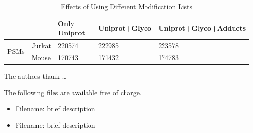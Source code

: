 \documentclass[journal=jprobs,manuscript=article]{achemso}
\begin{document}
\begin{table}[]
\centering
\caption{Effects of Using Different Modification Lists}
\label{tab:table3}
\begin{tabular}{ll|l|l|l}
                      &        & Only Uniprot & Uniprot+Glyco & Uniprot+Glyco+Adducts\\
\hline
\multirow{2}{*}{PSMs} & Jurkat  & 220574   &  222985 & 223578\\
                      & Mouse    & 170743   &   171432& 174783 
\end{tabular}
\end{table}


%
\begin{acknowledgement}

The authors thank \ldots
\end{acknowledgement}

\begin{suppinfo}

The following files are available free of charge.
\begin{itemize}
  \item Filename: brief description
  \item Filename: brief description
\end{itemize}

\end{suppinfo}

\newpage


\end{document}
